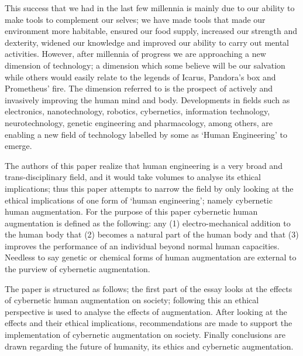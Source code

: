 
This success that we had in the last few millennia is mainly due to our ability to make tools to complement our selves; we have made tools that made our environment more habitable, ensured our food supply, increased our strength and dexterity, widened our knowledge and improved our ability to carry out mental activities. However, after millennia of progress we are approaching a new dimension of technology; a dimension which some believe will be our salvation while others would easily relate to the legends of Icarus, Pandora’s box and Prometheus’ fire. The dimension referred to is the prospect of actively and invasively improving the human mind and body. Developments in fields such as electronics, nanotechnology, robotics, cybernetics, information technology, neurotechnology, genetic engineering and pharmacology, among others, are enabling a new field of technology labelled by some as ‘Human Engineering’ to emerge.

The authors of this paper realize that human engineering is a very broad and trans-disciplinary field, and it would take volumes to analyse its ethical implications; thus this paper attempts to narrow the field by only looking at the ethical implications of one form of ‘human engineering’; namely cybernetic human augmentation. For the purpose of this paper cybernetic human augmentation is defined as the following: any (1) electro-mechanical addition to the human body that (2) becomes a natural part of the human body and that (3) improves the performance of an individual beyond normal human capacities. Needless to say genetic or chemical forms of human augmentation are external to the purview of cybernetic augmentation.

The paper is structured as follows; the first part of the essay looks at the effects of cybernetic human augmentation on society; following this an ethical perspective is used to analyse the effects of augmentation. After looking at the effects and their ethical implications, recommendations are made to support the implementation of cybernetic augmentation on society. Finally conclusions are drawn regarding the future of humanity, its ethics and cybernetic augmentation.
